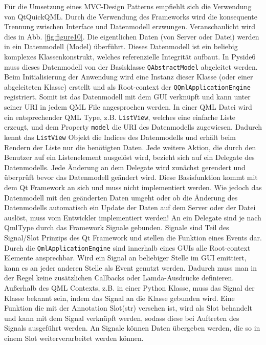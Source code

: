 Für die Umsetzung eines MVC-Design Patterns empfiehlt sich die Verwendung von QtQuickQML.
Durch die Verwendung des Frameworks wird die konsequente Trennung zwischen Interface und Datenmodell erzwungen.
Veranschaulicht wird dies in Abb. \ref{fig:figure10}.
Die eigentlichen Daten (von Server oder Datei) werden in ein Datenmodell (Model) überführt.
Dieses Datenmodell ist ein beliebig komplexes Klassenkonstrukt, welches referenzielle Integrität aufbaut.
In Pyside6 muss dieses Datenmodell von der Basisklasse \verb|QAbstractModel| abgeleitet werden.
Beim Initialisierung der Anwendung wird eine Instanz dieser Klasse (oder einer abgeleiteten Klasse) erstellt und als
Root-context der \verb|QQmlApplicationEngine| registriert.
Somit ist das Datenmodell mit dem GUI verknüpft und kann unter seiner URI in jedem QML File angesprochen werden.
In einer QML Datei wird ein entsprechender QML Type, z.B. \verb|ListView|, welches eine einfache Liste erzeugt,
und dem Property \verb|model| die URI des Datenmodells zugewiesen.
Dadurch kennt das \verb|ListView| Objekt die Indices des Datenmodells und erhält beim Rendern der Liste nur die benötigten
Daten.
Jede weitere Aktion, die durch den Benutzer auf ein Listenelement ausgelöst wird, bezieht sich auf ein Delegate des Datenmodells.
Jede Änderung an dem Delegate wird zunächst gerendert und überprüft bevor das Datenmodell geändert wird.
Diese Basisfunktion kommt mit dem Qt Framework an sich und muss nicht implementiert werden.
Wie jedoch das Datenmodell mit den geänderten Daten umgeht oder ob die Änderung des Datenmodells automatisch ein Update
der Daten auf dem Server oder der Datei auslöst, muss vom Entwickler implementiert werden!
An ein Delegate sind je nach QmlType durch das Framework Signale gebunden.
Signale sind Teil des Signal/Slot Prinzips des Qt Framework \cite{pysideSignalSlot} und stellen die Funktion eines Events dar.
Durch die \verb|QmlApplicationEngine| sind innerhalb eines GUIs alle Root-context Elemente ansprechbar.
Wird ein Signal an beliebiger Stelle im GUI emittiert, kann es an jeder anderen Stelle als Event genutzt werden.
Dadurch muss man  in der Regel keine zusätzlichen Callbacks oder Lamda-Ausdrücke definieren.
Außerhalb des QML Contexts, z.B. in einer Python Klasse, muss das Signal der Klasse bekannt sein, indem das Signal an die Klasse
gebunden wird.
Eine Funktion die mit der Annotation \glqq Slot(str) \grqq versehen ist, wird als Slot behandelt und kann mit dem Signal
verknüpft werden, sodass diese bei Auftreten des Signals ausgeführt werden.
An Signale können Daten übergeben werden, die so in einem Slot weiterverarbeitet werden können.\\
